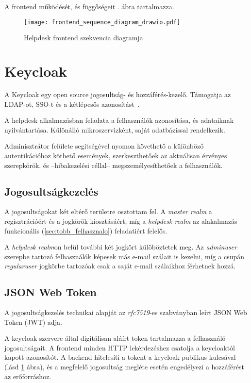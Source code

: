 A frontend működését, és függőségeit . ábra tartalmazza.

\begin{figure}[hbp] 
	\centering
	\texttt{[image: frontend\_sequence\_diagram\_drawio.pdf]}
	\caption{Helpdesk frontend szekvencia diagramja}
	\label{fig:frontend_sequence_diagram}
\end{figure}


\section{Keycloak}\label{sec:keycloak}
A Keycloak egy open source jogosultság- és hozzáférés-kezelő. Támogatja az LDAP-ot, SSO-t és a kétlépcsős azonosítást~\cite{Keycloak_website}. 

A helpdesk alkalmazásban feladata a felhasználók azonosítása, és adataiknak nyilvántartása. Különálló mikroszervizként, saját adatbázissal rendelkezik.

Adminisztrátor felülete segítségével nyomon követhető a különböző autentikációhoz köthető események, szerkeszthetőek az aktuálisan érvényes szerepkörök, és --hibakezelési céllal-- megszemélyesíthetőek a felhasználók.


\subsection{Jogosultságkezelés}
A jogosultságokat két eltérő területre osztottam fel. A \textit{master realm} a regisztrációért és a jogkörök kiosztásáért, míg a \textit{helpdesk realm} az alakalmazás funkcionális (\ref{sec:tobb_felhasznalo}) feladatiért felelős.

A \textit{helpdesk realm}on belül további két jogkört külöböztetek meg. Az \textit{admin\textunderscore user} szerepbe tartozó felhasználók képesek más e-mail szálait is kezelni, míg a csupán \textit{regular\textunderscore user} jogkörbe tartozóak csak a saját e-mail szálaikhoz férhetnek hozzá.


\subsection{JSON Web Token}\label{sec:JWT}
A jogosultságkezelés technikai alapját az \textit{rfc7519}-es szabványban \cite{rfc7519_JSON_Web_Token} leírt JSON Web Token (JWT) adja. 

A keycloak szervere által digitálisan aláírt token tartalmazza a felhasználó jogosultságait. A frontend minden HTTP lekérdezéshez csatolja a keycloaktól kapott azonosítót. A backend hitelesíti a tokent a keycloak publikus kulcsával (lásd \ref{fig:frontend_sequence_diagram} ábra), és a megfelelő jogosultság megléte esetén engedélyezi a hozzáférést az erőforráshoz.



